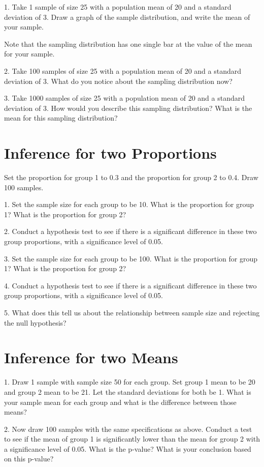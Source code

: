 \documentclass[11pt]{amsart}
\begin{document}
1.  Take 1 sample of size 25 with a population mean of 20 and a standard deviation of 3. Draw a graph of the sample distribution, and write the mean of your sample.


Note that the sampling distribution has one single bar at the value of the mean for your sample.

2.  Take 100 samples of size 25 with a population mean of 20 and a standard deviation of 3.  What do you notice about the sampling distribution now?

3. Take 1000 samples of size 25 with a population mean of 20 and a standard deviation of 3.  How would you describe this sampling distribution? What is the mean for this sampling distribution?


\section{Inference for two Proportions}

Set the proportion for group 1 to 0.3 and the proportion for group 2 to 0.4.  Draw 100 samples.

1. Set the sample size for each group to be 10.  What is the proportion for group 1? What is the proportion for group 2?

2. Conduct a hypothesis test to see if there is a significant difference in these two group proportions, with a significance level of 0.05.


3. Set the sample size for each group to be 100.  What is the proportion for group 1? What is the proportion for group 2?

4. Conduct a hypothesis test to see if there is a significant difference in these two group proportions, with a significance level of 0.05.

5. What does this tell us about the relationship between sample size and rejecting the null hypothesis?


\section{Inference for two Means}
1. Draw 1 sample with sample size 50 for each group. Set group 1 mean to be 20 and group 2 mean to be 21.  Let the standard deviations for both be 1.  What is your sample mean for each group and what is the difference between those means?

2. Now draw 100 samples with the same specifications as above. Conduct a test to see if the mean of group 1 is significantly lower than the mean for group 2 with a significance level of 0.05. What is the p-value? What is your conclusion based on this p-value?
\end{document}
